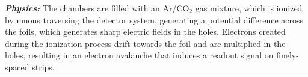 \textbf{\textit{Physics:}}
The chambers are filled with an Ar/CO$_2$ gas mixture, which is ionized by muons traversing the detector system, generating a potential difference across the foils, which generates sharp electric fields in the holes. Electrons created during the ionization process drift towards the foil and are multiplied in the holes, resulting in an electron avalanche that induces a readout signal on finely-spaced strips.









